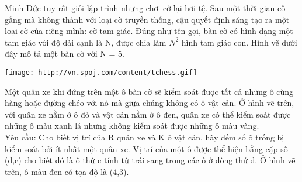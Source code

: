 Minh Đức tuy rất giỏi lập trình nhưng chơi cờ lại hơi tệ. Sau một thời gian cố gắng mà không thành với loại cờ truyền thống, cậu quyết định sáng tạo ra một loại cờ của riêng mình: cờ tam giác. Đúng như tên gọi, bàn cờ có hình dạng một tam giác với độ dài cạnh là N, được chia làm $N^{2}$   hình tam giác con. Hình vẽ dưới đây mô tả một bàn cờ với N = 5.  


\texttt{[image: http://vn.spoj.com/content/tchess.gif]}

   Một quân xe khi đứng trên một ô bàn cờ sẽ kiểm soát được tất cả những ô cùng hàng hoặc đường chéo với nó mà giữa chúng không có ô vật cản. Ở hình vẽ trên, với quân xe nằm ở ô đỏ và vật cản nằm ở ô đen, quân xe có thể kiểm soát được những ô màu xanh lá nhưng không kiểm soát được những ô màu vàng.   
\\   Yêu cầu: Cho biết vị trí của R quân xe và K ô vật cản, hãy đếm số ô trống bị kiểm soát bởi ít nhất một quân xe. Vị trí của một ô được thể hiện bằng cặp số (d,c) cho biết đó là ô thứ c tính từ trái sang trong các ô ở dòng thứ d. Ở hình vẽ trên, ô màu đen có tọa độ là (4,3).